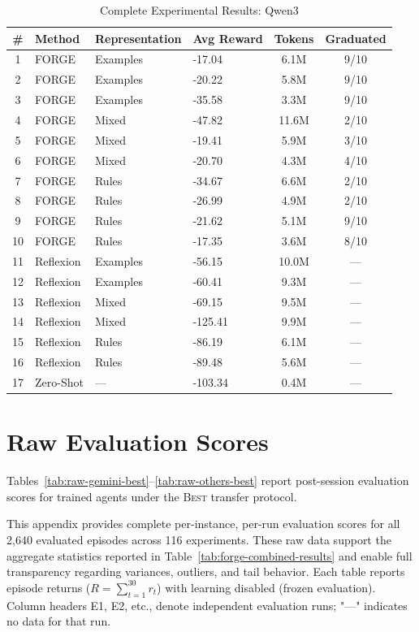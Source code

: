 \documentclass[sigconf]{acmart}
\begin{document}
  \begin{table}[htbp]
  \centering
  \scriptsize
  \caption{Complete Experimental Results: Qwen3}
  \label{tab:full-results-qwen3}
  \begin{tabular}{clllcc}
  \toprule
  \textbf{\#} & \textbf{Method} & \textbf{Representation} & \textbf{Avg Reward} & \textbf{Tokens} & \textbf{Graduated} \\
  \midrule
  1 & FORGE & Examples & -17.04 & 6.1M & 9/10 \\
  2 & FORGE & Examples & -20.22 & 5.8M & 9/10 \\
  3 & FORGE & Examples & -35.58 & 3.3M & 9/10 \\
  4 & FORGE & Mixed & -47.82 & 11.6M & 2/10 \\
  5 & FORGE & Mixed & -19.41 & 5.9M & 3/10 \\
  6 & FORGE & Mixed & -20.70 & 4.3M & 4/10 \\
  7 & FORGE & Rules & -34.67 & 6.6M & 2/10 \\
  8 & FORGE & Rules & -26.99 & 4.9M & 2/10 \\
  9 & FORGE & Rules & -21.62 & 5.1M & 9/10 \\
  10 & FORGE & Rules & -17.35 & 3.6M & 8/10 \\
  \midrule
  11 & Reflexion & Examples & -56.15 & 10.0M & --- \\
  12 & Reflexion & Examples & -60.41 & 9.3M & --- \\
  13 & Reflexion & Mixed & -69.15 & 9.5M & --- \\
  14 & Reflexion & Mixed & -125.41 & 9.9M & --- \\
  15 & Reflexion & Rules & -86.19 & 6.1M & --- \\
  16 & Reflexion & Rules & -89.48 & 5.6M & --- \\
  \midrule
  17 & Zero-Shot & --- & -103.34 & 0.4M & --- \\
  \bottomrule
  \end{tabular}
  \end{table}

  \section{Raw Evaluation Scores}
\label{app:raw-scores}

Tables~\ref{tab:raw-gemini-best}--\ref{tab:raw-others-best} report post-session evaluation scores for trained agents under the \textsc{Best} transfer protocol.

This appendix provides complete per-instance, per-run evaluation scores for all 2,640 evaluated episodes across 116 experiments. These raw data support the aggregate statistics reported in Table~\ref{tab:forge-combined-results} and enable full transparency regarding variances, outliers, and tail behavior. Each table reports episode returns ($R = \sum_{t=1}^{30} r_t$) with learning disabled (frozen evaluation). Column headers E1, E2, etc., denote independent evaluation runs; "—" indicates no data for that run.
\end{document}
